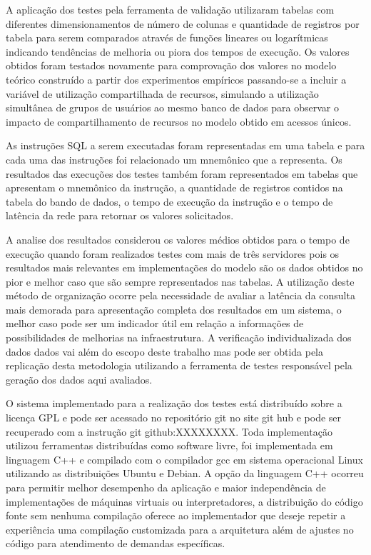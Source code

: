 \documentclass[12pt, a4paper]{article}
\begin{document}
A aplicação dos testes pela ferramenta de validação utilizaram tabelas com diferentes dimensionamentos de 
número de colunas e quantidade de registros por tabela para serem comparados através de funções lineares
ou logarítmicas indicando tendências de melhoria ou piora dos tempos de execução. Os valores obtidos foram
testados novamente para comprovação dos valores no modelo teórico construído a partir dos experimentos empíricos
passando-se a incluir a variável de utilização compartilhada de recursos, simulando a utilização simultânea
de grupos de usuários ao mesmo banco de dados para observar o impacto de compartilhamento de recursos no
modelo obtido em acessos únicos.


As instruções SQL a serem executadas foram representadas em uma tabela e para cada uma das instruções foi
relacionado um mnemônico que a representa. Os resultados das execuções dos testes também foram representados
em tabelas que apresentam o mnemônico da instrução, a quantidade de registros contidos na tabela do 
bando de dados, o tempo de execução da instrução e o tempo de latência da rede para retornar os valores
solicitados.

A analise dos resultados considerou os valores médios obtidos para o tempo de execução quando foram realizados
testes com mais de três servidores pois os resultados mais relevantes em implementações do modelo 
são os dados obtidos no pior e melhor caso que são sempre representados nas tabelas. A utilização deste
método de organização ocorre pela necessidade de avaliar a latência da consulta mais demorada para
apresentação completa dos resultados em um sistema, o melhor caso pode ser um indicador útil em relação
a informações de possibilidades de melhorias na infraestrutura. A verificação individualizada dos
dados dados vai além do escopo deste trabalho mas pode ser obtida pela replicação desta metodologia
utilizando a ferramenta de testes responsável pela geração dos dados aqui avaliados.

O sistema implementado para a realização dos testes está distribuído sobre a licença GPL e pode ser acessado
no repositório git no site git hub e pode ser recuperado com a instrução git github:XXXXXXXX. Toda 
implementação utilizou ferramentas distribuídas como software livre, foi implementada em linguagem C++
e compilado com o compilador gcc em sistema operacional Linux utilizando as distribuições Ubuntu
e Debian. A opção da linguagem C++ ocorreu para permitir melhor desempenho da aplicação e maior independência
de implementações de máquinas virtuais ou interpretadores, a distribuição do código fonte sem nenhuma
compilação oferece ao implementador que deseje repetir a experiência uma compilação customizada para
a arquitetura além de ajustes no código para atendimento de demandas específicas.
\end{document}
